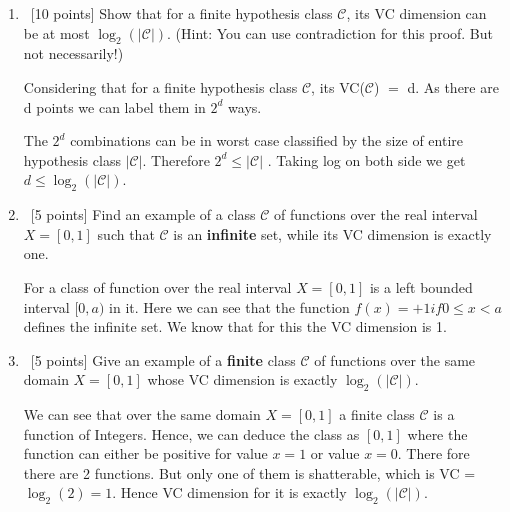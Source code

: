 \begin{enumerate}
  \begin{enumerate}
  \item ~[10 points] Show that for a finite hypothesis class
    $\mathcal{C}$, its VC dimension can be at most
    $\log_2\left(|\mathcal{C}|\right)$. (Hint: You can use
    contradiction for this proof. But not necessarily!)
\begin{solution}
Considering that for a finite hypothesis class $\mathcal{C}$, its VC($\mathcal{C}$) $=$ d. As there are d points we can label them in $2^d$ ways.

The $2^d$ combinations can be in worst case classified by the size of entire hypothesis class $|\mathcal{C}|$. Therefore $2^d \leq |\mathcal{C}|$ .
Taking log on both side we get $d \leq \log_2\left(|\mathcal{C}|\right)$.
\end{solution}
  \item ~[5 points] Find an example of a class $\mathcal{C}$ of
    functions over the real interval $X = [0,1]$ such that
    $\mathcal{C}$ is an {\bf infinite} set, while its VC dimension is
    exactly one.
\begin{solution}
For a class of function over the real interval $X = [0,1]$ is a left bounded interval $[0,a)$ in it. Here we can see that the function $f(x) = +1 if 0 \leq x < a$  defines the infinite set. We know that for this the VC dimension is 1.
\end{solution}
  \item ~[5 points] Give an example of a {\bf finite} class
    $\mathcal{C}$ of functions over the same domain $X = [0,1]$ whose
    VC dimension is exactly $\log_2(|\mathcal{C}|)$.
\begin{solution}
We can see that over the same domain $X = [0,1]$ a finite class $\mathcal{C}$ is a function of Integers. Hence, we can deduce the class as $[0,1]$ where the function can either be positive for value $x=1$ or value $x=0$. There fore there are 2 functions. But only one of them is shatterable, which is VC = $\log_2 (2) = 1$. Hence VC dimension for it is exactly $\log_2(|\mathcal{C}|)$.
\end{solution}
  \end{enumerate}
  
\end{enumerate}

